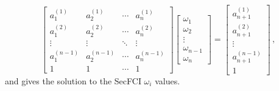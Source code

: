 \documentclass[letterpaper, 10 pt, conference]{ieeeconf}  %
\providecommand{\DIFaddbegin}{} %
\providecommand{\DIFaddend}{} %
\providecommand{\DIFdelbegin}{} %
\providecommand{\DIFdelend}{} %
\begin{document}
\begin{equation}
   \DIFdelbegin %
\DIFdelend \DIFaddbegin \begin{bmatrix}
      a_1^{(1)} & a_2^{(1)} & \cdots & a_{n}^{(1)} \\
      a_1^{(2)} & a_2^{(2)} & \cdots & a_{n}^{(2)} \\
      \vdots & \vdots & \ddots & \vdots \\
      a_1^{(n-1)} & a_2^{(n-1)} & \cdots & a_{n}^{(n-1)} \\
      1 & 1 & \cdots & 1
   \end{bmatrix}\DIFaddend 
   \DIFdelbegin %
\DIFdelend \DIFaddbegin \begin{bmatrix}
      \omega_1 \\
      \omega_2 \\
      \vdots \\
      \omega_{n-1} \\
      \omega_{n}
   \end{bmatrix}\DIFaddend 
   =
   \begin{bmatrix}
      a_{n+1}^{(1)} \\
      a_{n+1}^{(2)} \\
      \vdots \\
      a_{n+1}^{(n-1)} \\
      1
   \end{bmatrix}\,, \label{eqn:hyperplane_sol_eq}
\end{equation}
and gives the solution to the SecFCI $\omega_i$ values.
\end{document}
